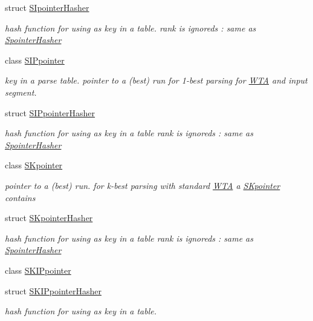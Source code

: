\begin{DoxyCompactItemize}
\item 
struct \mbox{\hyperlink{structSIpointerHasher}{S\+Ipointer\+Hasher}}
\begin{DoxyCompactList}\small\item\em hash function for using as key in a table. rank is ignoreds \+: same as \mbox{\hyperlink{structSpointerHasher}{Spointer\+Hasher}} \end{DoxyCompactList}\item 
class \mbox{\hyperlink{classSIPpointer}{S\+I\+Ppointer}}
\begin{DoxyCompactList}\small\item\em key in a parse table. pointer to a (best) run for 1-\/best parsing for \mbox{\hyperlink{classWTA}{W\+TA}} and input segment. \end{DoxyCompactList}\item 
struct \mbox{\hyperlink{structSIPpointerHasher}{S\+I\+Ppointer\+Hasher}}
\begin{DoxyCompactList}\small\item\em hash function for using as key in a table rank is ignoreds \+: same as \mbox{\hyperlink{structSpointerHasher}{Spointer\+Hasher}} \end{DoxyCompactList}\item 
class \mbox{\hyperlink{classSKpointer}{S\+Kpointer}}
\begin{DoxyCompactList}\small\item\em pointer to a (best) run. for k-\/best parsing with standard \mbox{\hyperlink{classWTA}{W\+TA}} a \mbox{\hyperlink{classSKpointer}{S\+Kpointer}} contains \end{DoxyCompactList}\item 
struct \mbox{\hyperlink{structSKpointerHasher}{S\+Kpointer\+Hasher}}
\begin{DoxyCompactList}\small\item\em hash function for using as key in a table rank is ignoreds \+: same as \mbox{\hyperlink{structSpointerHasher}{Spointer\+Hasher}} \end{DoxyCompactList}\item 
class \mbox{\hyperlink{classSKIPpointer}{S\+K\+I\+Ppointer}}
\item 
struct \mbox{\hyperlink{structSKIPpointerHasher}{S\+K\+I\+Ppointer\+Hasher}}
\begin{DoxyCompactList}\small\item\em hash function for using as key in a table. \end{DoxyCompactList}\item 

\end{DoxyCompactItemize}
